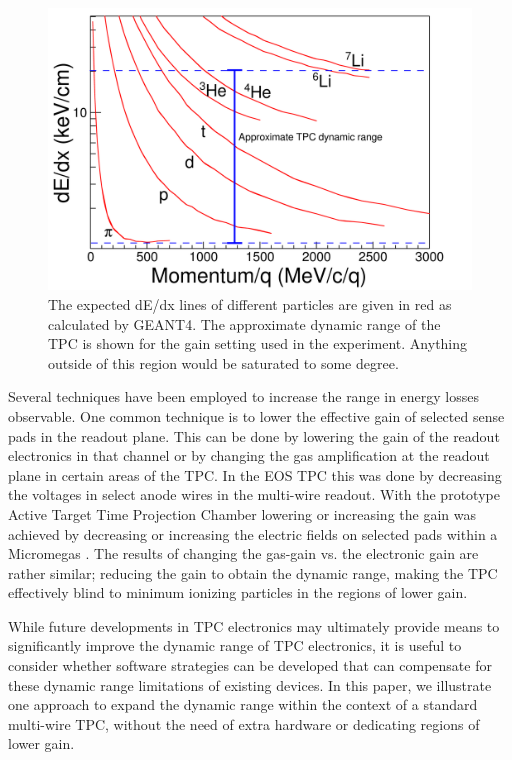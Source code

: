 \documentclass[review]{elsarticle}
\begin{document}
 
\begin{figure}[H]
\includegraphics[width=\linewidth]{intrographic}
\caption{The expected dE/dx lines of different particles are given in red as calculated by GEANT4. The approximate dynamic range of the TPC is shown for the gain setting used in the experiment. Anything outside of this region would be saturated to some degree.}
\label{fig:intro}
\end{figure}

Several techniques have been employed to increase the range in energy losses observable. One common technique is to lower the effective gain of selected sense pads in the readout plane. This can be done by lowering the gain of the readout electronics in that channel or by changing the gas amplification at the readout plane in certain areas of the TPC. In the EOS TPC \cite{eos} this was done by decreasing the voltages in select anode wires in the multi-wire readout. With the prototype Active Target Time Projection Chamber lowering or increasing the gain was achieved by decreasing or increasing the electric fields on selected pads within a Micromegas \cite{pattpc}. The results of changing the gas-gain vs. the electronic gain are rather similar; reducing the gain to obtain the dynamic range, making the TPC effectively blind to minimum ionizing particles in the regions of lower gain. 

While future developments in TPC electronics may ultimately provide means to significantly improve the dynamic range of TPC electronics, it is useful to consider whether software strategies can be developed that can compensate for these dynamic range limitations of existing devices. In this paper, we illustrate one approach to expand the dynamic range within the context of a standard multi-wire TPC, without the need of extra hardware or dedicating regions of lower gain.
\end{document}
